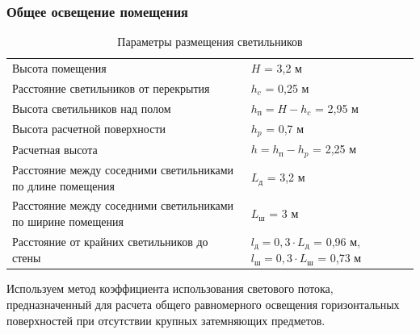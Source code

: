 \subsubsection{Общее освещение помещения}

\begin{table}[ht]
    \centering
    \begin{tabu}{X[l,m]|X[l,m]}
        \hline
        Высота помещения                                                        & $H$ = 3,2 м                                   \\
        Расстояние светильников от перекрытия                                   & $h_c$ = 0,25 м                                \\
        Высота светильников над полом                                           & $h_\text{п} = H - h_c$ = 2,95 м               \\
        Высота расчетной поверхности                                            & $h_p$ = 0,7 м                                 \\
        Расчетная высота                                                        & $h = h_\text{п} - h_p$ = 2,25 м               \\
        Расстояние между соседними светильниками по длине помещения             & $L_\text{д}$ = 3,2 м                          \\
        Расстояние между соседними светильниками по ширине помещения            & $L_\text{ш}$ = 3 м                            \\
        Расстояние от крайних светильников до стены                             & $l_\text{д} = 0,3 \cdot L_\text{д}$ = 0,96 м, \newline
                                                                                  $l_\text{ш} = 0,3 \cdot L_\text{ш}$ = 0,73 м  \\
        \hline
    \end{tabu}
    \caption{Параметры размещения светильников}
    \label{lamps_arrangement_parameters}
\end{table}

Используем метод коэффициента использования светового потока, предназначенный для
расчета общего равномерного освещения горизонтальных поверхностей при отсутствии
крупных затемняющих предметов.

